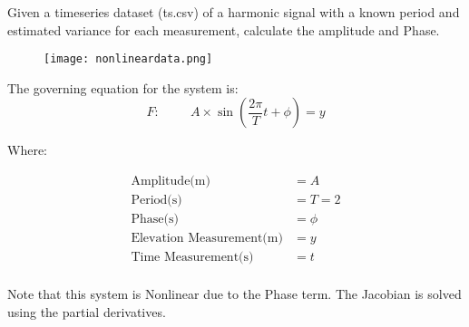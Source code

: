 Given a timeseries dataset (ts.csv) of a harmonic signal with a known period and estimated variance for each measurement, calculate the amplitude and Phase.
\begin{figure}[H]
	\centering
	\texttt{[image: nonlineardata.png]}
\end{figure}

The governing equation for the system is:
\[
F:\hspace{1cm} A \times \sin(\dfrac{2\pi}{T}t + \phi) = y
\]

Where:

\begin{align*}
\text{Amplitude(m)} &= A \\
\text{Period(s)}    &= T = 2 \\
\text{Phase(s)}     &= \phi \\
\text{Elevation Measurement(m)} &= y \\
\text{Time Measurement(s)} &= t \\	
\end{align*}

Note that this system is Nonlinear due to the Phase term.  The Jacobian is solved using the partial derivatives.

